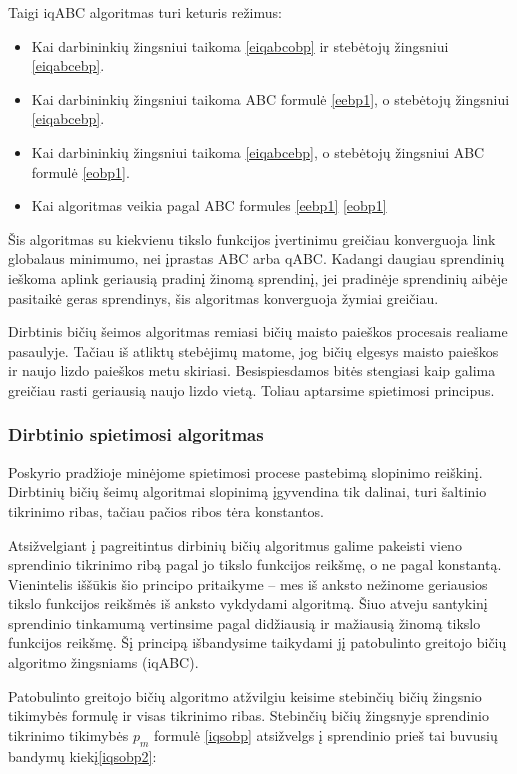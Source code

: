 \documentclass{VUMIFPSmagistrinis}
\begin{document}
Taigi iqABC algoritmas turi keturis režimus:
\begin{itemize}
    \item Kai darbininkių žingsniui taikoma \eqref{eiqabcobp} ir stebėtojų žingsniui \eqref{eiqabcebp}.
    \item Kai darbininkių žingsniui taikoma ABC formulė \eqref{eebp1}, o stebėtojų žingsniui \eqref{eiqabcebp}.
    \item Kai darbininkių žingsniui taikoma \eqref{eiqabcebp}, o stebėtojų žingsniui ABC formulė \eqref{eobp1}.
    \item Kai algoritmas veikia pagal ABC formules \eqref{eebp1}  \eqref{eobp1}
\end{itemize}

Šis algoritmas su kiekvienu tikslo funkcijos įvertinimu greičiau konverguoja link globalaus minimumo, nei įprastas ABC arba qABC. Kadangi daugiau sprendinių ieškoma aplink geriausią pradinį žinomą sprendinį, jei pradinėje sprendinių aibėje pasitaikė geras sprendinys, šis algoritmas konverguoja žymiai greičiau.

Dirbtinis bičių šeimos algoritmas remiasi bičių maisto paieškos procesais realiame pasaulyje. Tačiau iš atliktų stebėjimų matome, jog bičių elgesys maisto paieškos ir naujo lizdo paieškos metu skiriasi. Besispiesdamos bitės stengiasi kaip galima greičiau rasti geriausią naujo lizdo vietą. Toliau aptarsime spietimosi principus.


\subsubsection{Dirbtinio spietimosi algoritmas}

Poskyrio pradžioje minėjome spietimosi procese pastebimą slopinimo reiškinį. Dirbtinių bičių šeimų algoritmai slopinimą įgyvendina tik dalinai, turi šaltinio tikrinimo ribas, tačiau pačios ribos tėra konstantos.

Atsižvelgiant į pagreitintus dirbinių bičių algoritmus galime pakeisti vieno sprendinio tikrinimo ribą pagal jo tikslo funkcijos reikšmę, o ne pagal konstantą. Vienintelis iššūkis šio principo pritaikyme – mes iš anksto nežinome geriausios tikslo funkcijos reikšmės iš anksto vykdydami algoritmą. Šiuo atveju santykinį sprendinio tinkamumą vertinsime pagal didžiausią ir mažiausią žinomą tikslo funkcijos reikšmę. Šį principą išbandysime taikydami jį patobulinto greitojo bičių algoritmo žingsniams (iqABC).

Patobulinto greitojo bičių algoritmo atžvilgiu keisime stebinčių bičių žingsnio tikimybės formulę ir visas tikrinimo ribas. Stebinčių bičių žingsnyje sprendinio tikrinimo tikimybės  $p_{m}$ formulė \eqref{iqsobp} atsižvelgs į sprendinio prieš tai buvusių bandymų kiekį\eqref{iqsobp2}:
\end{document}
